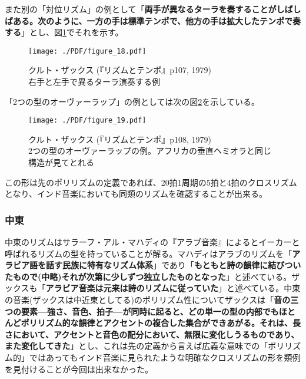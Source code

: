 \documentclass[uplatex,dvipdfmx]{ujarticle}
\begin{document}
また別の「対位リズム」の例として「{\bf 両手が異なるターラを奏することがしばしばある。次のように、一方の手は標準テンポで、他方の手は拡大したテンポで奏する}」\cite{sachs:01}とし、図\ref{fig:figure_18}でそれを示す。

\begin{figure}[ht]
\centerline{
	\texttt{[image: ./PDF/figure\_18.pdf]}
}
\caption{クルト・ザックス (『リズムとテンポ』p107, 1979)\\
右手と左手で異るターラ演奏する例}
\label{fig:figure_18}
\end{figure}

「2つの型のオーヴァーラップ」の例としては次の図\ref{fig:figure_19}を示している。

\begin{figure}[ht]
\centerline{
	\texttt{[image: ./PDF/figure\_19.pdf]}
}
\caption{クルト・ザックス (『リズムとテンポ』p108, 1979)\\
2つの型のオーヴァーラップの例。アフリカの垂直ヘミオラと同じ構造が見てとれる}
\label{fig:figure_19}
\end{figure}

この形は先のポリリズムの定義であれば、20拍1周期の5拍と4拍のクロスリズムとなり、インド音楽においても同類のリズムを確認することが出来る。


\subsubsection{中東}

中東のリズムはサラーフ・アル・マハディの『アラブ音楽』によるとイーカーと呼ばれるリズムの型を持っていることが解る。マハディはアラブのリズムを「{\bf アラビア語を話す民族に特有なリズム体系}」\cite{mahdi:01}であり「{\bf もともと詩の韻律に結びついたもので(中略)それが次第に少しずつ独立したものとなった}」\cite{mahdi:01}と述べている。ザックスも「{\bf アラビア音楽は元来は詩のリズムに従っていた}」\cite{sachs:01}と述べている。中東の音楽(ザックスは中近東としてる)のポリリズム性についてザックスは「{\bf 音の三つの要素---強さ、音色、拍子---が同時に起ると、どの単一の型の内部でもほとんどポリリズム的な韻律とアクセントの複合した集合ができあがる。それは、長さにおいて、アクセントと音色の配分において、無限に変化しうるものであり、また変化してきた}」\cite{sachs:01}とし、これは先の定義から言えば広義な意味での「ポリリズム的」ではあってもインド音楽に見られたような明確なクロスリズムの形を類例を見付けることが今回は出来なかった。
\end{document}
